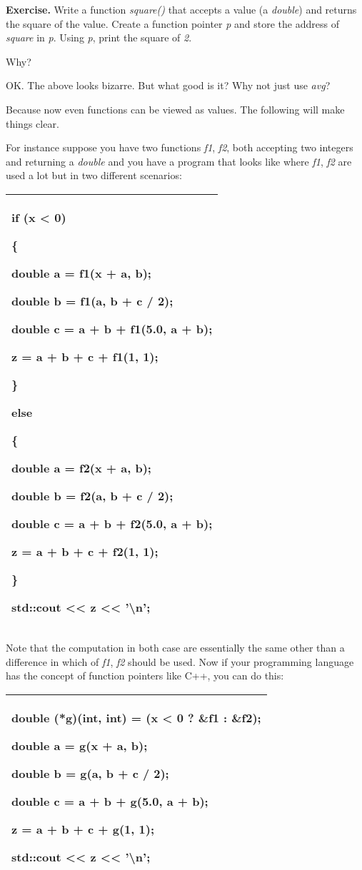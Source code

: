 \documentclass[
]{article}
\begin{document}
\textbf{Exercise.} Write a function \emph{square()} that accepts a value
(a \emph{double}) and returns the square of the value. Create a function
pointer \emph{p} and store the address of \emph{square} in \emph{p}.
Using \emph{p}, print the square of \emph{2}.

Why?

OK. The above looks bizarre. But what good is it? Why not just use
\emph{avg}?

Because now even functions can be viewed as values. The following will
make things clear.

For instance suppose you have two functions \emph{f1}, \emph{f2}, both
accepting two integers and returning a \emph{double} and you have a
program that looks like where \emph{f1}, \emph{f2} are used a lot but in
two different scenarios:

\begin{longtable}[]{@{}l@{}}
\toprule
\endhead
\begin{minipage}[t]{0.97\columnwidth}\raggedright
if (x \textless{} 0)

\{

double a = f1(x + a, b);

double b = f1(a, b + c / 2);

double c = a + b + f1(5.0, a + b);

z = a + b + c + f1(1, 1);

\}

else

\{

double a = f2(x + a, b);

double b = f2(a, b + c / 2);

double c = a + b + f2(5.0, a + b);

z = a + b + c + f2(1, 1);

\}

std::cout \textless\textless{} z \textless\textless{}
'\textbackslash n';\strut
\end{minipage}\tabularnewline
\bottomrule
\end{longtable}

Note that the computation in both case are essentially the same other
than a difference in which of \emph{f1}, \emph{f2} should be used. Now
if your programming language has the concept of function pointers like
C++, you can do this:

\begin{longtable}[]{@{}l@{}}
\toprule
\endhead
\begin{minipage}[t]{0.97\columnwidth}\raggedright
double (*g)(int, int) = (x \textless{} 0 ? \&f1 : \&f2);

double a = g(x + a, b);

double b = g(a, b + c / 2);

double c = a + b + g(5.0, a + b);

z = a + b + c + g(1, 1);

std::cout \textless\textless{} z \textless\textless{}
'\textbackslash n';\strut
\end{minipage}\tabularnewline
\bottomrule
\end{longtable}
\end{document}
